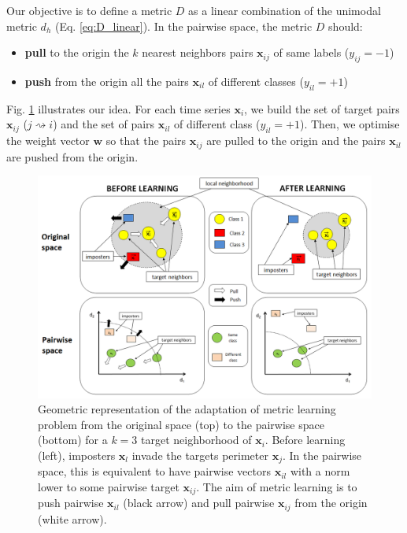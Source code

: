 Our objective is to define a metric $D$ as a linear combination of the unimodal metric $d_h$ (Eq. \ref{eq:D_linear}). In the pairwise space, the metric $D$ should:
\begin{itemize}
	\item \textbf{pull} to the origin the $k$ nearest neighbors pairs $\textbf{x}_{ij}$ of same labels ($y_{ij}=-1$)
	\item \textbf{push} from the origin all the pairs $\textbf{x}_{il}$ of different classes ($y_{il}=+1$)
\end{itemize}
Fig. \ref{fig:Transposition_Pairwise} illustrates our idea. For each time series $\textbf{x}_i$, we build the set of target pairs $\textbf{x}_{ij}$ ($j \rightsquigarrow i$) and the set of pairs $\textbf{x}_{il}$ of different class ($y_{il}=+1$). Then, we optimise the weight vector $\textbf{w}$ so that the pairs $\textbf{x}_{ij}$ are pulled to the origin and the pairs $\textbf{x}_{il}$ are pushed from the origin.

\begin{figure}[h!]
	\centering
	\includegraphics[width=0.9\linewidth]{images/Transposition_Pairwise}
	\caption{Geometric representation of the adaptation of metric learning problem from the original space (top) to the pairwise space (bottom) for a $k=3$ target neighborhood of $\textbf{x}_i$. Before learning (left), imposters $\textbf{x}_l$ invade the targets perimeter $\textbf{x}_j$. In the pairwise space, this is equivalent to have pairwise vectors $\textbf{x}_{il}$ with a norm lower to some pairwise target $\textbf{x}_{ij}$. The aim of metric learning is to push pairwise $\textbf{x}_{il}$ (black arrow) and pull pairwise $\textbf{x}_{ij}$ from the origin (white arrow).}
	\label{fig:Transposition_Pairwise}
\end{figure}

